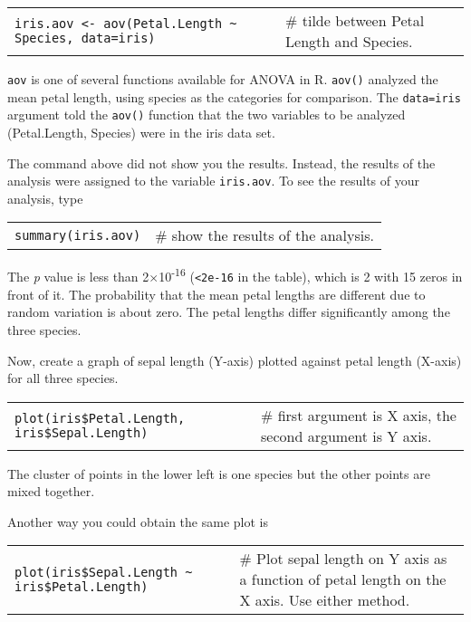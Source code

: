 \documentclass[11pt]{article}
\begin{document}
\begin{tabular}{@{}L{4in}L{1.5in}@{}}
\texttt{iris.aov \textless{}- aov(Petal.Length \textasciitilde{} Species,
data=iris)} &  \# tilde between Petal Length and Species.\\
\end{tabular}

\texttt{aov} is one of several functions available for ANOVA in R. \texttt{aov()} analyzed
the mean petal length, using species as the categories for comparison.
The \texttt{data=iris} argument told the \texttt{aov()} function that the two variables to
be analyzed (Petal.Length, Species) were in the iris data set.

The command above did not show you the results. Instead, the results of
the analysis were assigned to the variable \texttt{iris.aov}. To see the results
of your analysis, type

\begin{tabular}{@{}L{1.5in}L{4in}@{}}
\texttt{summary(iris.aov)} & \# show the results of the analysis. \\
\end{tabular}

The \emph{p} value is less than 2$\times$10\textsuperscript{-16}
(\texttt{\textless{}2e-16} in the table), which is 2 with 15 zeros in front of
it. The probability that the mean petal lengths are different due to
random variation is about zero. The petal lengths differ significantly
among the three species.

Now, create a graph of sepal length (Y-axis) plotted against petal
length (X-axis) for all three species.

\begin{tabular}{@{}L{3.5in}L{2.25in}@{}}
\texttt{plot(iris\$Petal.Length, iris\$Sepal.Length)} & \# first argument is X
axis, the second argument is Y axis.\\
\end{tabular}

The cluster of points in the lower left is one species but the other
points are mixed together.

Another way you could obtain the same plot is

\begin{tabular}{@{}L{3.5in}L{2.25in}@{}}
\texttt{plot(iris\$Sepal.Length \textasciitilde{} iris\$Petal.Length)} & \# Plot
sepal length on Y axis as a function of petal length on the X axis. Use either method.\\
\end{tabular}
\end{document}
